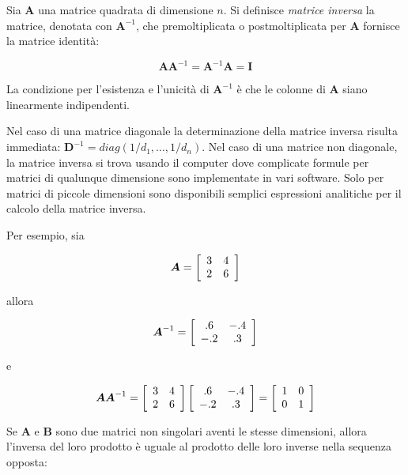 \documentclass[
  11pt,
]{krantz}
\theoremstyle{definition}
\theoremstyle{definition}
\theoremstyle{definition}
\theoremstyle{definition}
\theoremstyle{remark}
\begin{document}
Sia \(\boldsymbol{A}\) una matrice quadrata di dimensione \(n\). Si definisce \emph{matrice inversa} la matrice, denotata con \(\boldsymbol{A}^{-1}\), che premoltiplicata o postmoltiplicata per \(\boldsymbol{A}\) fornisce la matrice identità:

\[\boldsymbol{A}\boldsymbol{A}^{-1}=\boldsymbol{A}^{-1}\boldsymbol{A}=\boldsymbol{I}\]

La condizione per l'esistenza e l'unicità di \(\boldsymbol{A}^{-1}\) è che le colonne di \(\boldsymbol{A}\) siano linearmente indipendenti.

Nel caso di una matrice diagonale la determinazione della matrice inversa risulta immediata: \(\boldsymbol{D}^{-1}= diag(1/d_1, \dots, 1/d_n)\). Nel caso di una matrice non diagonale, la matrice inversa si trova usando il computer dove complicate formule per matrici di qualunque dimensione sono implementate in vari software. Solo per matrici di piccole dimensioni sono disponibili semplici espressioni analitiche per il calcolo della matrice inversa.

Per esempio, sia

\[\boldsymbol{A} =  \left[ \begin{array}{c c}
3 & 4 \\
2 & 6
\end{array}
 \right]\]

allora

\[\boldsymbol{A}^{-1} =  \left[ \begin{array}{c c}
.6 & -.4 \\
-.2 & .3
\end{array}
 \right]\]

e

\[\boldsymbol{A}\boldsymbol{A}^{-1} =\left[ \begin{array}{c c}
3 & 4 \\
2 & 6
\end{array}
 \right]
\left[ \begin{array}{c c}
.6 & -.4 \\
-.2 & .3
\end{array}
 \right] =
 \left[ \begin{array}{c c}
1 & 0 \\
0 & 1
\end{array}
 \right]\]

Se \(\boldsymbol{A}\) e \(\boldsymbol{B}\) sono due matrici non singolari aventi le stesse dimensioni, allora l'inversa del loro prodotto è uguale al prodotto delle loro inverse nella sequenza opposta:
\end{document}
